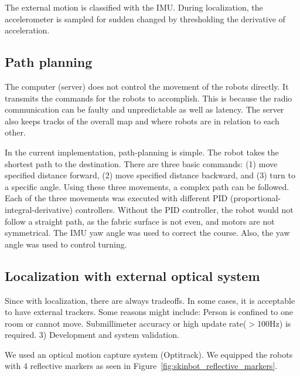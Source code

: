 The external motion is classified with the IMU. During localization, the accelerometer is sampled for sudden changed by thresholding the derivative of acceleration. 

\subsection{Path planning}
The computer (server) does not control the movement of the robots directly. It transmits the commands for the robots to accomplish. This is because the radio communication can be faulty and unpredictable as well as latency. The server also keeps tracks of the overall map and where robots are in relation to each other.

In the current implementation, path-planning is simple. The robot takes the shortest path to the destination. There are three basic commands: (1) move specified distance forward,  (2) move specified distance backward, and (3) turn to a specific angle. Using these three movements, a complex path can be followed. Each of the three movements was executed with different PID (proportional-integral-derivative) controllers. Without the PID controller, the robot would not follow a straight path, as the fabric surface is not even, and motors are not symmetrical. The IMU yaw angle was used to correct the course. Also, the yaw angle was used to control turning.  



\subsection{Localization with external optical system}
Since with localization, there are always tradeoffs. In some cases, it is acceptable to have external trackers. Some reasons might include: Person is confined to one room or cannot move. Submillimeter accuracy or high update rate($>$100Hz) is required. 3) Development and system validation. 

We used an optical motion capture system (Optitrack). We equipped the robots with 4 reflective markers as seen in Figure~\ref{fig:skinbot_reflective_markers}. 

